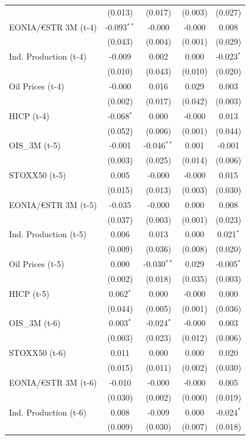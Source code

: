 \begin{longtable}[t]{lcccc}
 & (0.013) & (0.017) & (0.003) & (0.027)\\
EONIA/€STR 3M (t-4) & -0.093$^{**}$ & -0.000 & -0.000 & 0.008\\
 & (0.043) & (0.004) & (0.001) & (0.029)\\
Ind. Production (t-4) & -0.009 & 0.002 & 0.000 & -0.023$^{*}$\\
 & (0.010) & (0.043) & (0.010) & (0.020)\\
Oil Prices (t-4) & -0.000 & 0.016 & 0.029 & 0.003\\
 & (0.002) & (0.017) & (0.042) & (0.003)\\
HICP (t-4) & -0.068$^{*}$ & 0.000 & -0.000 & 0.013\\
 & (0.052) & (0.006) & (0.001) & (0.044)\\
OIS\_3M (t-5) & -0.001 & -0.046$^{**}$ & 0.001 & -0.001\\
 & (0.003) & (0.025) & (0.014) & (0.006)\\
STOXX50 (t-5) & 0.005 & -0.000 & -0.000 & 0.015\\
 & (0.015) & (0.013) & (0.003) & (0.030)\\
EONIA/€STR 3M (t-5) & -0.035 & -0.000 & 0.000 & 0.008\\
 & (0.037) & (0.003) & (0.001) & (0.023)\\
Ind. Production (t-5) & 0.006 & 0.013 & 0.000 & 0.021$^{*}$\\
 & (0.009) & (0.036) & (0.008) & (0.020)\\
Oil Prices (t-5) & 0.000 & -0.030$^{**}$ & 0.029 & -0.005$^{*}$\\
 & (0.002) & (0.018) & (0.035) & (0.003)\\
HICP (t-5) & 0.062$^{*}$ & 0.000 & -0.000 & 0.000\\
 & (0.044) & (0.005) & (0.001) & (0.036)\\
OIS\_3M (t-6) & 0.003$^{*}$ & -0.024$^{*}$ & -0.000 & 0.003\\
 & (0.003) & (0.023) & (0.012) & (0.006)\\
STOXX50 (t-6) & 0.011 & 0.000 & 0.000 & 0.020\\
 & (0.015) & (0.011) & (0.002) & (0.030)\\
EONIA/€STR 3M (t-6) & -0.010 & -0.000 & -0.000 & 0.005\\
 & (0.030) & (0.002) & (0.000) & (0.019)\\
Ind. Production (t-6) & 0.008 & -0.009 & 0.000 & -0.024$^{*}$\\
 & (0.009) & (0.030) & (0.007) & (0.018)\\

\end{longtable}
